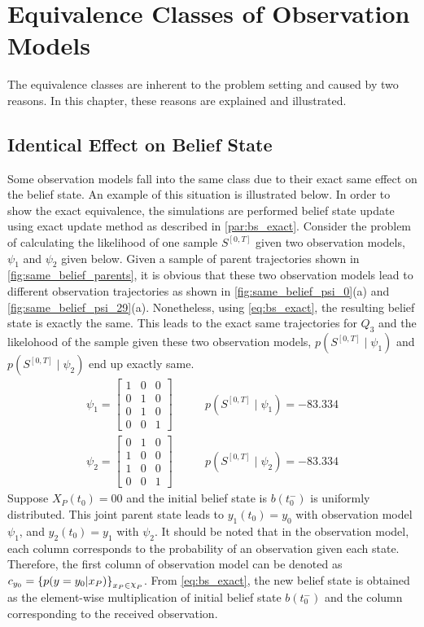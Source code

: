 \chapter{Equivalence Classes of Observation Models}
\label{ap:eq_classes}
The equivalence classes are inherent to the problem setting and caused by two reasons. In this chapter, these reasons are explained and illustrated.
\section*{Identical Effect on Belief State}
\label{ap:eq_classes_same_belief}
Some observation models fall into the same class due to their exact same effect on the belief state. An example of this situation is illustrated below. In order to show the exact equivalence, the simulations are performed belief state update using exact update method as described in \cref{par:bs_exact}. Consider the problem of calculating the likelihood of one sample $ S^{[0,T]} $ given two observation models, $ \psi_1 $ and $ \psi_2 $ given below. Given a sample of parent trajectories shown in \autoref{fig:same_belief_parents}, it is obvious that these two observation models lead to different observation trajectories as shown in \autoref{fig:same_belief_psi_0}(a) and \autoref{fig:same_belief_psi_29}(a). Nonetheless, using \autoref{eq:bs_exact}, the resulting belief state is exactly the same. This leads to the exact same trajectories for $ Q_3 $ and the likelohood of the sample given these two observation models, $ p(S^{[0,T]} \mid \psi_1 ) $ and $ p(S^{[0,T]} \mid \psi_2 ) $ end up exactly same. 
\begin{align}
\psi_{1} =
\begin{bmatrix}
1 & 0 & 0 \\
0 & 1 & 0 \\
0 & 1 & 0 \\
0 & 0 & 1
\end{bmatrix} &\quad \quad
p(S^{[0,T]} \mid \psi_1 ) = -83.334 \label{eq:psi_1_0}\\
\psi_{2} =
\begin{bmatrix}
0 & 1 & 0 \\
1 & 0 & 0 \\
1 & 0 & 0 \\
0 & 0 & 1
\end{bmatrix} &\quad \quad
p(S^{[0,T]} \mid \psi_2 ) = -83.334
\label{eq:psi_29}
\end{align}
Suppose $ X_P(t_0) = 00 $ and the initial belief state is $ b(t_0^-) $ is uniformly distributed. This joint parent state leads to $ y_1(t_0) = y_0 $ with observation model $ \psi_1 $, and $ y_2(t_0) = y_1 $ with $ \psi_2 $. It should be noted that in the observation model, each column corresponds to the probability of an observation given each state. Therefore, the first column of observation model can be denoted as $ c_{y_0} = \left\lbrace p(y=y_0|x_P)\right\rbrace_{x_P \in \rchi_P}  $. From \autoref{eq:bs_exact}, the new belief state is obtained as the element-wise multiplication of initial belief state $ b(t_0^-) $ and the column corresponding to the received observation.
